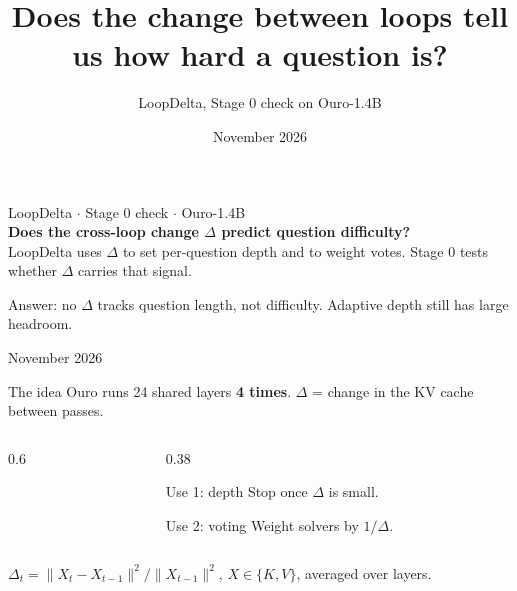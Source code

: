 \documentclass[aspectratio=169,11pt]{beamer}
\title{Does the change between loops tell us how hard a question is?}
\subtitle{LoopDelta, Stage 0 check on Ouro-1.4B}
\date{November 2026}
\newcommand{\src}[1]{\par\vfill\begin{minipage}{0.9\textwidth}\color{muted}\tiny #1\end{minipage}\vspace{-0.4em}}
\begin{document}
\begin{frame}[plain]
  \vspace{2em}
  {\color{muted}\small LoopDelta \;$\cdot$\; Stage 0 check \;$\cdot$\; Ouro-1.4B}\\[0.8em]
  {\LARGE\bfseries Does the cross-loop change $\Delta$ predict question difficulty?}\\[1.2em]
  {\color{muted} LoopDelta uses $\Delta$ to set per-question depth and to weight votes. Stage 0 tests whether $\Delta$ carries that signal.}
  \vspace{1.2em}
  \begin{block}{Answer: no}
    $\Delta$ tracks question length, not difficulty. Adaptive depth still has large headroom.
  \end{block}
  \vfill
  {\color{muted}\small November 2026}
\end{frame}

\begin{frame}{The idea}
  Ouro runs 24 shared layers \textbf{4 times}. $\Delta$ = change in the KV cache between passes.
  \vspace{0.6em}

  \begin{columns}[T]
    \begin{column}{0.6\textwidth}
    \end{column}
    \begin{column}{0.38\textwidth}
      \begin{block}{Use 1: depth}
        \small Stop once $\Delta$ is small.
      \end{block}
      \begin{block}{Use 2: voting}
        \small Weight solvers by $1/\Delta$.
      \end{block}
    \end{column}
  \end{columns}
  \src{$\Delta_t = \|X_t - X_{t-1}\|^2 / \|X_{t-1}\|^2$, $X\in\{K,V\}$, averaged over layers.}
\end{frame}
\end{document}
